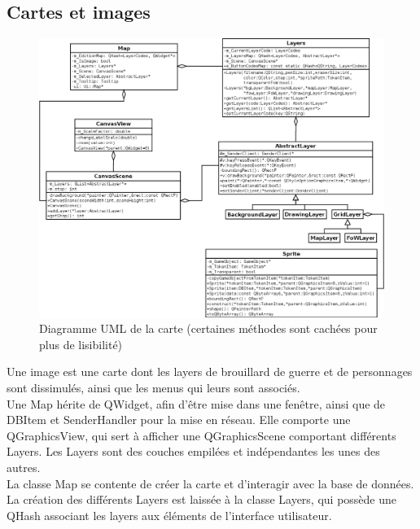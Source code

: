 \subsection{Cartes et images}

\begin{figure}[h!]
	\centering
	\includegraphics[width=\textwidth]{img/map_uml.png}
	\caption{Diagramme UML de la carte (certaines méthodes sont cachées pour plus de lisibilité)}
\end{figure}

Une image est une carte dont les layers de brouillard de guerre et de personnages sont dissimulés, ainsi que les menus qui leurs sont associés.\\
Une Map hérite de QWidget, afin d'être mise dans une fenêtre, ainsi que de DBItem et SenderHandler pour la mise en réseau. Elle comporte une QGraphicsView, qui sert à afficher une QGraphicsScene comportant différents Layers. Les Layers sont des couches empilées et indépendantes les unes des autres.\\
La classe Map se contente de créer la carte et d'interagir avec la base de données. La création des différents Layers est laissée à la classe Layers, qui possède une QHash associant les layers aux éléments de l'interface utilisateur.\\

